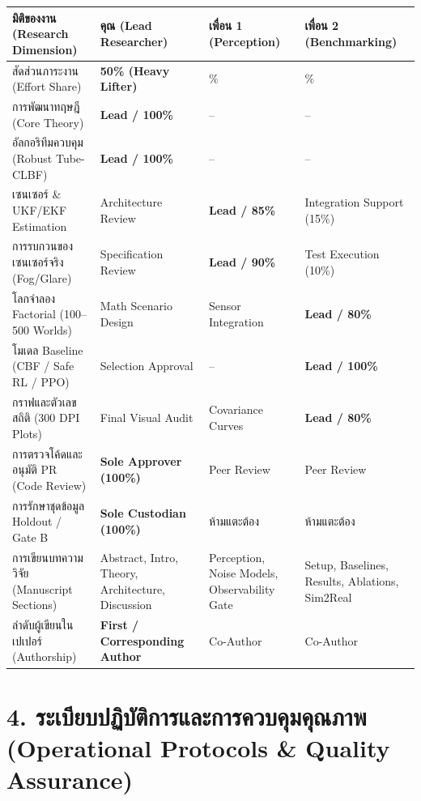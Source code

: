 \documentclass[10pt,a4paper]{article}
\begin{document}
\begin{center}
\footnotesize
\begin{tabularx}{\textwidth}{l >{\centering\arraybackslash}p{2.6cm} >{\centering\arraybackslash}p{2.8cm} >{\centering\arraybackslash}p{2.8cm}}
\toprule
\textbf{มิติของงาน (Research Dimension)} & \textbf{คุณ (Lead Researcher)} & \textbf{เพื่อน 1 (Perception)} & \textbf{เพื่อน 2 (Benchmarking)} \\
\midrule
สัดส่วนภาระงาน (Effort Share) & \textbf{50\% (Heavy Lifter)} & 25\% & 25\% \\
การพัฒนาทฤษฎี (Core Theory) & \textbf{Lead / 100\%} & -- & -- \\
อัลกอริทึมควบคุม (Robust Tube-CLBF) & \textbf{Lead / 100\%} & -- & -- \\
เซนเซอร์ \& UKF/EKF Estimation & Architecture Review & \textbf{Lead / 85\%} & Integration Support (15\%) \\
การรบกวนของเซนเซอร์จริง (Fog/Glare) & Specification Review & \textbf{Lead / 90\%} & Test Execution (10\%) \\
โลกจำลอง Factorial (100--500 Worlds) & Math Scenario Design & Sensor Integration & \textbf{Lead / 80\%} \\
โมเดล Baseline (CBF / Safe RL / PPO) & Selection Approval & -- & \textbf{Lead / 100\%} \\
กราฟและตัวเลขสถิติ (300 DPI Plots) & Final Visual Audit & Covariance Curves & \textbf{Lead / 80\%} \\
การตรวจโค้ดและอนุมัติ PR (Code Review) & \textbf{Sole Approver (100\%)} & Peer Review & Peer Review \\
การรักษาชุดข้อมูล Holdout / Gate B & \textbf{Sole Custodian (100\%)} & ห้ามแตะต้อง & ห้ามแตะต้อง \\
การเขียนบทความวิจัย (Manuscript Sections) & Abstract, Intro, Theory, Architecture, Discussion & Perception, Noise Models, Observability Gate & Setup, Baselines, Results, Ablations, Sim2Real \\
ลำดับผู้เขียนในเปเปอร์ (Authorship) & \textbf{First / Corresponding Author} & Co-Author & Co-Author \\
\bottomrule
\end{tabularx}
\end{center}

\newpage

\section*{\textcolor{secondary}{\large 4. ระเบียบปฏิบัติการและการควบคุมคุณภาพ (Operational Protocols \& Quality Assurance)}}
\vspace{-4pt}
\end{document}
